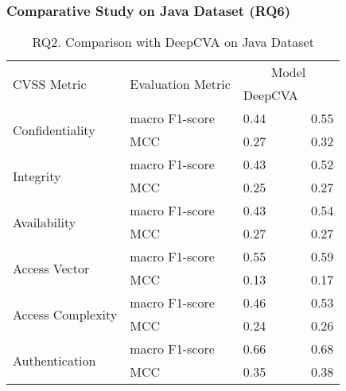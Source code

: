 \subsubsection{\bf Comparative Study on Java Dataset (RQ6)}

\begin{table}[t]
	\caption{RQ2. Comparison with DeepCVA on Java Dataset}
        \vspace{-9pt}
	\begin{center}
\small
		\renewcommand{\arraystretch}{1}
		\begin{tabular}{l|p{1.9cm}<{\centering}|p{1.5cm}<{\centering}|p{1.5cm}<{\centering}}
			\hline
			\multirow{2}{*}{CVSS Metric}     & \multirow{2}{*}{Evaluation Metric}  & \multicolumn{2}{c}{Model}\\
			\cline{3-4}
			&                                     & DeepCVA    & \tool       \\
			\hline
			\multirow{2}{*}{Confidentiality} & macro F1-score                             &     0.44       & 0.55\\
			\cline{2-4}
			& MCC                                 &      0.27      & 0.32\\
			\hline
			\multirow{2}{*}{Integrity}       & macro F1-score                             &    0.43        & 0.52\\
			\cline{2-4}
			& MCC                                 &    0.25        & 0.27\\
			\hline
			\multirow{2}{*}{Availability}    & macro F1-score                             &   0.43         & 0.54\\
			\cline{2-4}
			& MCC                                 &    0.27        & 0.27\\
			\hline
			\multirow{2}{*}{Access Vector}   & macro F1-score                             &   0.55         & 0.59\\
			\cline{2-4}
			& MCC                                 &    0.13        & 0.17\\
			\hline
			\multirow{2}{*}{Access Complexity} & macro F1-score                           &   0.46         & 0.53\\
			\cline{2-4}
			& MCC                                 &    0.24        & 0.26\\
			\hline
			\multirow{2}{*}{Authentication}  & macro F1-score                             &   0.66         & 0.68\\
			\cline{2-4}
			& MCC                                 &   0.35         & 0.38\\

\end{tabular}
\end{center}
\end{table}
